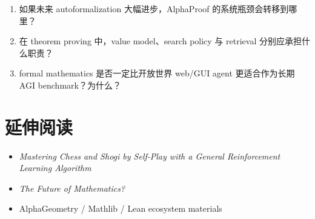 \begin{enumerate}
\item 如果未来 autoformalization 大幅进步，AlphaProof 的系统瓶颈会转移到哪里？
\item 在 theorem proving 中，value model、search policy 与 retrieval 分别应承担什么职责？
\item formal mathematics 是否一定比开放世界 web/GUI agent 更适合作为长期 AGI benchmark？为什么？
\end{enumerate}

\section{延伸阅读}

\begin{itemize}
\item \emph{Mastering Chess and Shogi by Self-Play with a General Reinforcement Learning Algorithm}
\item \emph{The Future of Mathematics?}
\item AlphaGeometry / Mathlib / Lean ecosystem materials
\end{itemize}
